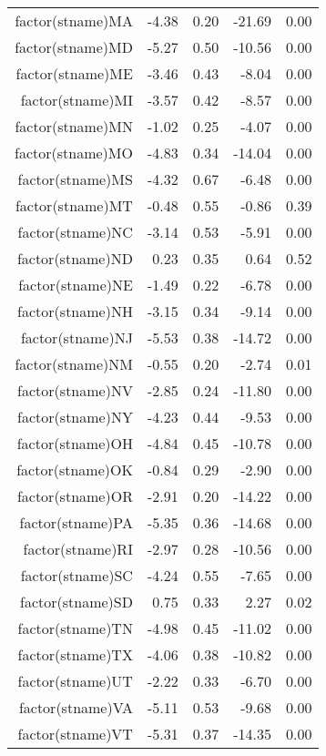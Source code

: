 \begin{table}[ht]
\begin{tabular}{rrrrr}
  factor(stname)MA & -4.38 & 0.20 & -21.69 & 0.00 \\ 
  factor(stname)MD & -5.27 & 0.50 & -10.56 & 0.00 \\ 
  factor(stname)ME & -3.46 & 0.43 & -8.04 & 0.00 \\ 
  factor(stname)MI & -3.57 & 0.42 & -8.57 & 0.00 \\ 
  factor(stname)MN & -1.02 & 0.25 & -4.07 & 0.00 \\ 
  factor(stname)MO & -4.83 & 0.34 & -14.04 & 0.00 \\ 
  factor(stname)MS & -4.32 & 0.67 & -6.48 & 0.00 \\ 
  factor(stname)MT & -0.48 & 0.55 & -0.86 & 0.39 \\ 
  factor(stname)NC & -3.14 & 0.53 & -5.91 & 0.00 \\ 
  factor(stname)ND & 0.23 & 0.35 & 0.64 & 0.52 \\ 
  factor(stname)NE & -1.49 & 0.22 & -6.78 & 0.00 \\ 
  factor(stname)NH & -3.15 & 0.34 & -9.14 & 0.00 \\ 
  factor(stname)NJ & -5.53 & 0.38 & -14.72 & 0.00 \\ 
  factor(stname)NM & -0.55 & 0.20 & -2.74 & 0.01 \\ 
  factor(stname)NV & -2.85 & 0.24 & -11.80 & 0.00 \\ 
  factor(stname)NY & -4.23 & 0.44 & -9.53 & 0.00 \\ 
  factor(stname)OH & -4.84 & 0.45 & -10.78 & 0.00 \\ 
  factor(stname)OK & -0.84 & 0.29 & -2.90 & 0.00 \\ 
  factor(stname)OR & -2.91 & 0.20 & -14.22 & 0.00 \\ 
  factor(stname)PA & -5.35 & 0.36 & -14.68 & 0.00 \\ 
  factor(stname)RI & -2.97 & 0.28 & -10.56 & 0.00 \\ 
  factor(stname)SC & -4.24 & 0.55 & -7.65 & 0.00 \\ 
  factor(stname)SD & 0.75 & 0.33 & 2.27 & 0.02 \\ 
  factor(stname)TN & -4.98 & 0.45 & -11.02 & 0.00 \\ 
  factor(stname)TX & -4.06 & 0.38 & -10.82 & 0.00 \\ 
  factor(stname)UT & -2.22 & 0.33 & -6.70 & 0.00 \\ 
  factor(stname)VA & -5.11 & 0.53 & -9.68 & 0.00 \\ 
  factor(stname)VT & -5.31 & 0.37 & -14.35 & 0.00 \\ 

\end{tabular}
\end{table}

